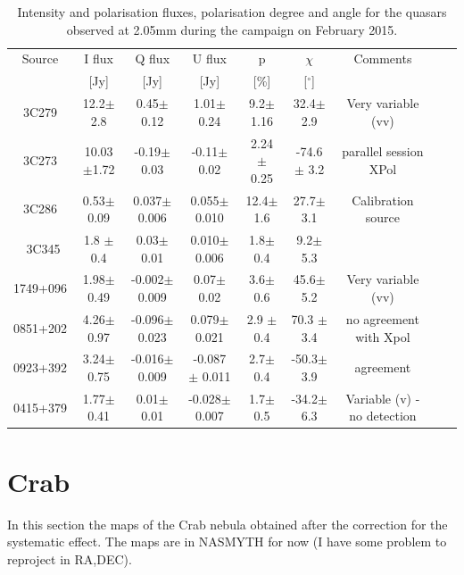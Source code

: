 \documentclass[a4paper,10pt]{article}
\begin{document}
\begin{table}[h!]
\caption{Intensity and polarisation fluxes, polarisation degree and angle for the quasars observed at 2.05mm during the campaign on February 2015.}
\begin{center}
\begin{tabular}{ccccccccc}
\hline
\hline
Source & I flux & Q flux &  U flux  & p & $\chi$ & Comments\\
 & [Jy] & [Jy] & [Jy] & [\%] & [$^\circ$]\\
\hline
3C279 &  12.2$\pm$2.8&  0.45$\pm$0.12 &  1.01$\pm$0.24 &  9.2$\pm$ 1.16 & 32.4$\pm$2.9 & Very variable (vv)\\
3C273 & 10.03 $\pm$1.72 & -0.19$\pm$ 0.03 & -0.11$\pm$ 0.02 &  2.24 $\pm$ 0.25 & -74.6 $\pm$ 3.2 & parallel session XPol\\
3C286 & 0.53$\pm$0.09 & 0.037$\pm$0.006 & 0.055$\pm$0.010 & 12.4$\pm$1.6 &  27.7$\pm$3.1 & Calibration source\\\
3C345 &  1.8 $\pm$ 0.4 & 0.03$\pm$0.01 & 0.010$\pm$0.006 & 1.8$\pm$0.4 &  9.2$\pm$5.3\\
1749+096 & 1.98$\pm$0.49 & -0.002$\pm$0.009 & 0.07$\pm$0.02 & 3.6$\pm$0.6 & 45.6$\pm$ 5.2 & Very variable (vv)\\
0851+202 &  4.26$\pm$0.97 & -0.096$\pm$0.023 & 0.079$\pm$0.021 & 2.9 $\pm$ 0.4 & 70.3 $\pm$3.4 & no agreement with Xpol\\
0923+392 & 3.24$\pm$0.75 & -0.016$\pm$0.009 &  -0.087 $\pm$ 0.011 & 2.7$\pm$0.4 & -50.3$\pm$3.9 & agreement\\
0415+379 & 1.77$\pm$0.41 & 0.01$\pm$0.01 & -0.028$\pm$0.007 & 1.7$\pm$0.5 & -34.2$\pm$6.3 & Variable (v) - no detection\\
\hline
\end{tabular}
\end{center}
\label{tab:tab_quasar_2mm}
\end{table}


\pagebreak
\section{Crab}
In this section the maps of the Crab nebula obtained after the correction for the systematic effect. The maps are in NASMYTH for now (I have some problem to reproject in RA,DEC).
\end{document}
